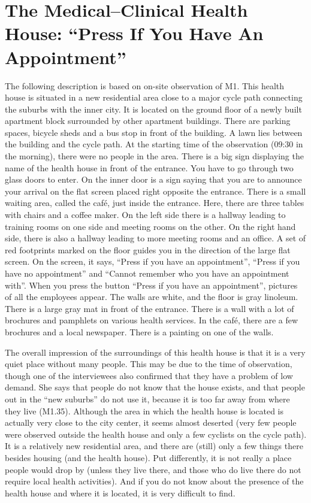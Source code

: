 \section{The Medical--Clinical Health House: “Press If You Have An Appointment”}
The following description is based on on-site observation of M1. This health house is situated in a new residential area close to a major cycle path connecting the suburbs with the inner city. It is located on the ground floor of a newly built apartment block surrounded by other apartment buildings. There are parking spaces, bicycle sheds and a bus stop in front of the building. A lawn lies between the building and the cycle path. At the starting time of the observation (09:30 in the morning), there were no people in the area. There is a big sign displaying the name of the health house in front of the entrance. You have to go through two glass doors to enter. On the inner door is a sign saying that you are to announce your arrival on the flat screen placed right opposite the entrance. There is a small waiting area, called the café, just inside the entrance. Here, there are three tables with chairs and a coffee maker. On the left side there is a hallway leading to training rooms on one side and meeting rooms on the other. On the right hand side, there is also a hallway leading to more meeting rooms and an office. A set of red footprints marked on the floor guides you in the direction of the large flat screen. On the screen, it says, “Press if you have an appointment”, “Press if you have no appointment” and “Cannot remember who you have an appointment with”. When you press the button “Press if you have an appointment”, pictures of all the employees appear. The walls are white, and the floor is gray linoleum. There is a large gray mat in front of the entrance. There is a wall with a lot of brochures and pamphlets on various health services. In the café, there are a few brochures and a local newspaper. There is a painting on one of the walls.
\par
The overall impression of the surroundings of this health house is that it is a very quiet place without many people. This may be due to the time of observation, though one of the interviewees also confirmed that they have a problem of low demand. She says that people do not know that the house exists, and that people out in the “new suburbs” do not use it, because it is too far away from where they live (M1.35). Although the area in which the health house is located is actually very close to the city center, it seems almost deserted (very few people were observed outside the health house and only a few cyclists on the cycle path). It is a relatively new residential area, and there are (still) only a few things there besides housing (and the health house). Put differently, it is not really a place people would drop by (unless they live there, and those who do live there do not require local health activities). And if you do not know about the presence of the health house and where it is located, it is very difficult to find.
